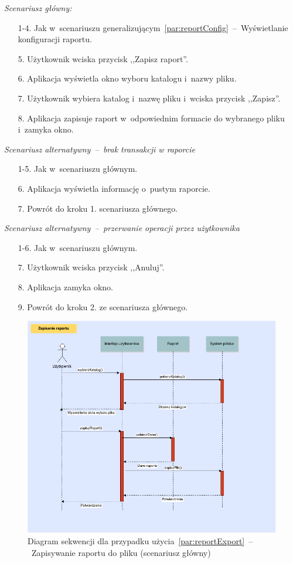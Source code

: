 \noindent \noindent \textit{Scenariusz główny:}
\begin{enumerate}
  \item[1-4.] Jak w~scenariuszu generalizującym~\ref{par:reportConfig}~--~Wyświetlanie konfiguracji raportu.
  \item[5.] Użytkownik wciska przycisk ,,Zapisz raport''.
  \item[6.] Aplikacja wyświetla okno wyboru katalogu i~nazwy pliku.
  \item[7.] Użytkownik wybiera katalog i~nazwę pliku i~wciska przycisk ,,Zapisz''.
  \item[8.] Aplikacja zapisuje raport w~odpowiednim formacie do wybranego pliku i~zamyka okno.
\end{enumerate}

\noindent \textit{Scenariusz alternatywny~--~brak transakcji w raporcie}
\begin{enumerate}
  \item[1-5.] Jak w~scenariuszu głównym.
  \item[6.] Aplikacja wyświetla informację o~pustym raporcie.
  \item[7.] Powrót do kroku 1. scenariusza głównego.
\end{enumerate}

\noindent \textit{Scenariusz alternatywny~--~przerwanie operacji przez użytkownika}
\begin{enumerate}
  \item[1-6.] Jak w~scenariuszu głównym.
  \item[7.] Użytkownik wciska przycisk ,,Anuluj''.
  \item[8.] Aplikacja zamyka okno.
  \item[9.] Powrót do kroku 2. ze scenariusza głównego.
\end{enumerate}

\begin{figure}[H]
  \includegraphics[width=\textwidth]{images/raport_export.png}
  \caption{Diagram sekwencji dla przypadku użycia~\ref{par:reportExport}~--~Zapisywanie raportu do pliku (scenariusz główny)}
\end{figure}

